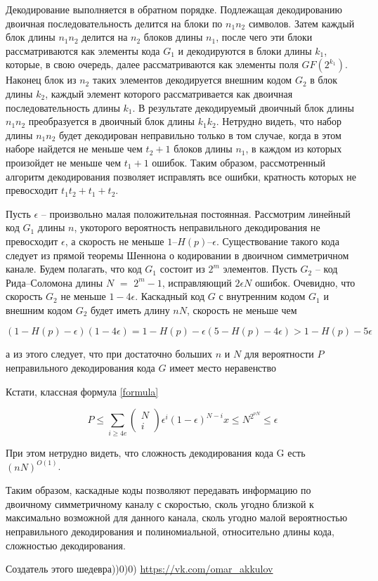 \documentclass[12pt]{article}
\numberwithin{equation}{section}
\begin{document}
	Декодирование выполняется в обратном порядке. Подлежащая декодированию двоичная последовательность делится на блоки по $n_1n_2$ символов.
	Затем каждый блок длины $n_1n_2$ делится на $n_2$ блоков длины $n_1$, после чего эти блоки рассматриваются как элементы кода $G_1$ и декодируются в блоки
	длины $k_1$, которые, в свою очередь, далее рассматриваются как элементы
	поля $GF(2^{{k}_{1}})$. Наконец блок из
	$n_2$ таких элементов декодируется внешним
	кодом
	$G_2$ в блок длины $k_2$, каждый элемент которого рассматривается как
	двоичная последовательность длины $k_1$. В результате декодируемый двоичный блок длины
	$n_1n_2$ преобразуется в двоичный блок длины $k_1k_2$. Нетрудно
	видеть, что набор длины
	$n_1n_2$ будет декодирован неправильно только в том
	случае, когда в этом наборе найдется не меньше чем $t_2+1$ блоков длины
	$n_1$,
	в каждом из которых произойдет не меньше чем $t_1+1$ ошибок. Таким образом, рассмотренный алгоритм декодирования позволяет исправлять все
	ошибки, кратность которых не превосходит $t_1t_2 + t_1 + t_2$.
	
	Пусть $\epsilon$ -- произвольно малая положительная постоянная. Рассмотрим
	линейный код
	$G_1$ длины $n$, укоторого вероятность неправильного декодирования не превосходит $\epsilon$, а скорость не меньше 
	$1$--$H(p)$--$\epsilon$. Существование
	такого кода следует из прямой теоремы Шеннона о кодировании в двоичном
	симметричном канале. Будем полагать, что код $G_1$ состоит из $2^m$ элементов. Пусть
	$G_2$ -- код Рида–Соломона длины
	$N$ $=$ $2^{m}-1$, исправляющий 
	$2\epsilon N$
	ошибок. Очевидно, что скорость
	$G_2$ не меньше $1-4\epsilon $. Каскадный код
	$G$ с внутренним кодом
	$G_1$ и внешним кодом
	$G_2$ будет иметь длину $nN$, скорость
	не меньше чем
	
	$$\left(1-H\left(p\right)-\epsilon \right)\left(1-4\epsilon \right)
	=
	1-H\left(p\right)-\epsilon\left(5-H\left(p\right)-4\epsilon\right)
	>1-H(p)-5\epsilon$$
	
	а из этого следует, что при достаточно больших $n$ и $N$ для вероятности $P$ неправильного декодирования кода $G$ имеет место неравенство 
	
	Кстати, классная формула \ref{formula}
	
	\begin{equation}\label{formula}
	P\le \sum _{i\ge 4e}\left(\begin{array}{c}N\\ i\end{array}\right){\epsilon }^{i}{\left(1-\epsilon \right)}^{N-i}x\le {N}^{{2}^{\nu N}}\le \epsilon 
	\end{equation}
	
	При этом нетрудно видеть, что сложность декодирования кода
	G есть $(nN)^{{O}{(1)}}$.
	
	Таким образом, каскадные коды позволяют передавать информацию по
	двоичному симметричному каналу с скоростью, сколь угодно близкой к
	максимально возможной для данного канала, сколь угодно малой вероятностью неправильного декодирования и полиномиальной, относительно
	длины кода, сложностью декодирования.
	
Создатель этого шедевра))0)0) \href{https://vk.com/omar_akkulov}{https://vk.com/omar\_akkulov}
\end{document}

